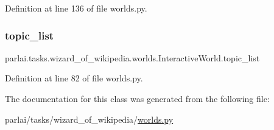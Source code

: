 Definition at line 136 of file worlds.\+py.

\mbox{\label{classparlai_1_1tasks_1_1wizard__of__wikipedia_1_1worlds_1_1InteractiveWorld_ad323b2b928a31a0b048059a1569ae8f2}} 
\subsubsection{\texorpdfstring{topic\+\_\+list}{topic\_list}}
{\footnotesize\ttfamily parlai.\+tasks.\+wizard\+\_\+of\+\_\+wikipedia.\+worlds.\+Interactive\+World.\+topic\+\_\+list}



Definition at line 82 of file worlds.\+py.



The documentation for this class was generated from the following file\+:\begin{DoxyCompactItemize}
\item 
parlai/tasks/wizard\+\_\+of\+\_\+wikipedia/\hyperlink{parlai_2tasks_2wizard__of__wikipedia_2worlds_8py}{worlds.\+py}\end{DoxyCompactItemize}
